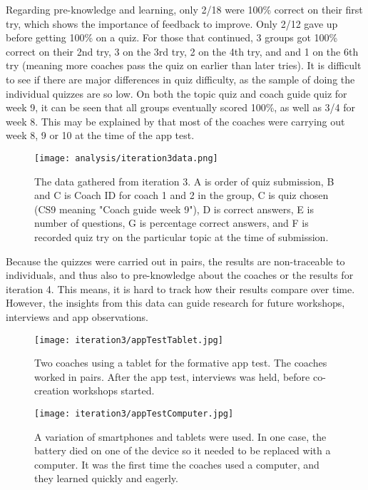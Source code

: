   Regarding pre-knowledge and learning, only 2/18 were 100\% correct on their first try, which shows the importance of feedback to improve. Only 2/12 gave up before getting 100\% on a quiz. For those that continued, 3 groups got 100\% correct on their 2nd try, 3 on the 3rd try, 2 on the 4th try, and and 1 on the 6th try (meaning more coaches pass the quiz on earlier than later tries). It is difficult to see if there are major differences in quiz difficulty, as the sample of doing the individual quizzes are so low. On both the topic quiz and coach guide quiz for week 9, it can be seen that all groups eventually scored 100\%, as well as 3/4 for week 8. This may be explained by that most of the coaches were carrying out week 8, 9 or 10 at the time of the app test.

  \begin{figure}[h]
    \centering
    \texttt{[image: analysis/iteration3data.png]}
    \caption{The data gathered from iteration 3. A is order of quiz submission, B and C is Coach ID for coach 1 and 2 in the group, C is quiz chosen (CS9 meaning "Coach guide week 9"), D is correct answers, E is number of questions, G is percentage correct answers, and F is recorded quiz try on the particular topic at the time of submission.}
    \label{fig:iteration3data}
  \end{figure}

  Because the quizzes were carried out in pairs, the results are non-traceable to individuals, and thus also to pre-knowledge about the coaches or the results for iteration 4. This means, it is hard to track how their results compare over time. However, the insights from this data can guide research for future workshops, interviews and app observations. %

  \begin{figure}[h]
    \centering
    \texttt{[image: iteration3/appTestTablet.jpg]}
    \caption{Two coaches using a tablet for the formative app test. The coaches worked in pairs. After the app test, interviews was held, before co-creation workshops started.}
    \label{fig:tabletTest}
  \end{figure}

  \begin{figure}[h]
    \centering
    \texttt{[image: iteration3/appTestComputer.jpg]}
    \caption{A variation of smartphones and tablets were used. In one case, the battery died on one of the device so it needed to be replaced with a computer. It was the first time the coaches used a computer, and they learned quickly and eagerly.}
    \label{fig:computerTest}
  \end{figure}

